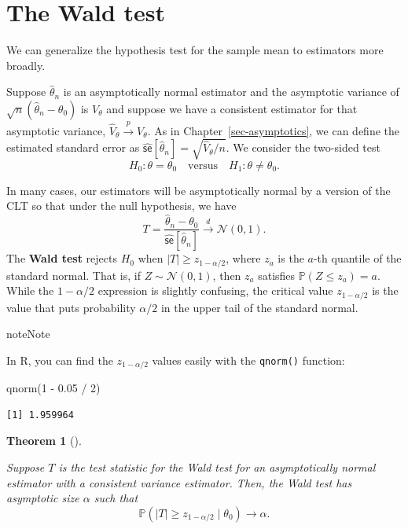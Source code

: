 \documentclass[
  13pt,
  letterpaper,
  DIV=11,
  numbers=noendperiod]{scrreprt}
\newenvironment{Shaded}{\begin{snugshade}}{\end{snugshade}}
\newcommand{\DecValTok}[1]{\textcolor[rgb]{0.68,0.00,0.00}{#1}}
\newcommand{\FloatTok}[1]{\textcolor[rgb]{0.68,0.00,0.00}{#1}}
\newcommand{\FunctionTok}[1]{\textcolor[rgb]{0.28,0.35,0.67}{#1}}
\newcommand{\NormalTok}[1]{\textcolor[rgb]{0.00,0.23,0.31}{#1}}
\newcommand{\SpecialCharTok}[1]{\textcolor[rgb]{0.37,0.37,0.37}{#1}}
\newcommand{\N}{\mathcal{N}}
\renewcommand{\P}{\mathbb{P}}
\newcommand{\inprob}{\overset{p}{\to}}
\newcommand{\indist}{\overset{d}{\to}}
\theoremstyle{plain}
\newtheorem{theorem}{Theorem}[chapter]
\theoremstyle{plain}
\theoremstyle{definition}
\theoremstyle{definition}
\theoremstyle{remark}
\begin{document}
\section{The Wald test}\label{sec-wald-test}

We can generalize the hypothesis test for the sample mean to estimators
more broadly.

Suppose \(\widehat{\theta}_n\) is an asymptotically normal estimator and
the asymptotic variance of \(\sqrt{n}(\widehat{\theta}_n - \theta_0)\)
is \(V_{\theta}\) and suppose we have a consistent estimator for that
asymptotic variance, \(\widehat{V}_{\theta} \inprob V_{\theta}\). As in
Chapter~\ref{sec-asymptotics}, we can define the estimated standard
error as
\(\widehat{\textsf{se}}[\widehat{\theta}_n] = \sqrt{\widehat{V}_{\theta} / n}\).
We consider the two-sided test \[
H_0: \theta = \theta_0 \quad\text{versus}\quad H_1: \theta \neq \theta_0.
\]

In many cases, our estimators will be asymptotically normal by a version
of the CLT so that under the null hypothesis, we have \[ 
T = \frac{\widehat{\theta}_n - \theta_0}{\widehat{\textsf{se}}[\widehat{\theta}_n]} \indist \N(0, 1). 
\] The \textbf{Wald test} rejects \(H_0\) when
\(|T| \geq z_{1-\alpha/2}\), where \(z_{a}\) is the \(a\)-th quantile of
the standard normal. That is, if \(Z \sim \N(0, 1)\), then \(z_a\)
satisfies \(\P(Z \leq z_a) = a\). While the \(1-\alpha/2\) expression is
slightly confusing, the critical value \(z_{1-\alpha/2}\) is the value
that puts probability \(\alpha/2\) in the upper tail of the standard
normal.

\begin{bookcallout}{note}{Note}

In R, you can find the \(z_{1- \alpha/2}\) values easily with the
\texttt{qnorm()} function:

\begin{Shaded}
\begin{Highlighting}[]
\FunctionTok{qnorm}\NormalTok{(}\DecValTok{1} \SpecialCharTok{{-}} \FloatTok{0.05} \SpecialCharTok{/} \DecValTok{2}\NormalTok{)}
\end{Highlighting}
\end{Shaded}

\begin{verbatim}
[1] 1.959964
\end{verbatim}

\end{bookcallout}

\begin{theorem}[]\protect\hypertarget{thm-wald}{}\label{thm-wald}

Suppose \(T\) is the test statistic for the Wald test for an
asymptotically normal estimator with a consistent variance estimator.
Then, the Wald test has asymptotic size \(\alpha\) such that \[ 
\P(|T| \geq z_{1 - \alpha/2} \mid \theta_0) \to \alpha.
\]

\end{theorem}
\end{document}
